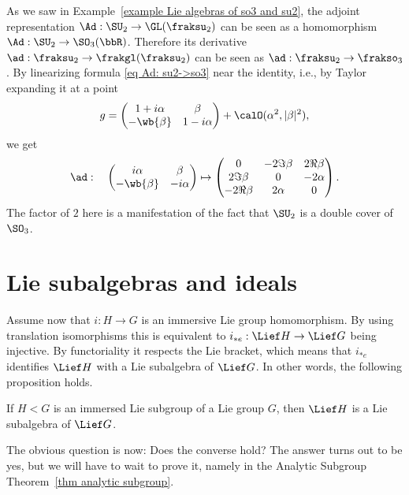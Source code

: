 \begin{example}
    As we saw in Example~\ref{example Lie algebras of so3 and su2}, the adjoint representation $\Ad:\SU_2\to \GL(\fraksu_2)$ can be seen as a homomorphism $\Ad:\SU_2\to \SO_3(\bbR)$. Therefore its derivative $\ad:\fraksu_2\to \frakgl(\fraksu_2)$ can be seen as $\ad:\fraksu_2\to \frakso_3$. By linearizing formula \eqref{eq Ad: su2->so3} near the identity, i.e., by Taylor expanding it at a point
    \[g=
    \begin{pmatrix}
        1+i\alpha &\beta \\
        -\wb{\beta} & 1-i\alpha
    \end{pmatrix}+\calO(\alpha^2,|\beta|^2),
    \]
    we get 
    \[\ad:\quad \begin{pmatrix}
        i\alpha&\beta\\-\wb{\beta}&-i\alpha
    \end{pmatrix}\mapsto 
    \begin{pmatrix}
        0&-2\Im \beta & 2\Re\beta\\
        2\Im \beta & 0 & -2\alpha \\
        -2\Re\beta & 2\alpha & 0
    \end{pmatrix}.\label{eq ad: su2->so3}\]
    The factor of $2$ here is a manifestation of the fact that $\SU_2$ is a double cover of $\SO_3$.
\end{example}








\section{Lie subalgebras and ideals}

Assume now that $i:H\to G$ is an immersive Lie group homomorphism. By using translation isomorphisms this is equivalent to $i_{\ast e}:\Lief H\to \Lief G$ being injective. By functoriality it respects the Lie bracket, which means that $i_{\ast e}$ identifies $\Lief H$ with a Lie subalgebra of $\Lief G$. In other words, the following proposition holds.

\begin{prop}
    If $H<G$ is an immersed Lie subgroup of a Lie group $G$, then $\Lief H$ is a Lie subalgebra of $\Lief G$.
\end{prop}

The obvious question is now: Does the converse hold? The answer turns out to be yes, but we will have to wait to prove it, namely in the Analytic Subgroup Theorem~\ref{thm analytic subgroup}.

